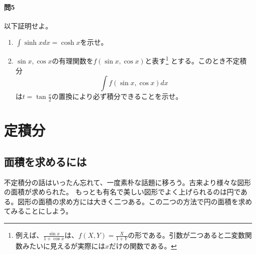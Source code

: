 \documentclass[a4j,dvipdfmx]{jsarticle}
\begin{document}
            \paragraph{問5}以下証明せよ。
                \begin{enumerate}\setcounter{enumi}{0}\renewcommand{\labelenumi}{(\arabic{enumi})}
                    \item $\displaystyle \int \sinh x dx = \cosh x$を示せ。
                    \item $\sin x,\cos x$の有理関数を$f(\sin x,\cos x)$と表す\footnote{例えば、$\frac{\sin x}{1+\cos x}$は、$f(X,Y)=\frac{X}{1+Y}$の形である。引数が二つあると二変数関数みたいに見えるが実際には$x$だけの関数である。}
                    とする。このとき不定積分
                        \begin{equation*}
                            \int f(\sin x,\cos x)dx
                        \end{equation*}
                        は$t=\tan\frac{x}{2}$の置換により必ず積分できることを示せ。
                \end{enumerate}
        \clearpage
        \section{定積分}
            \subsection{面積を求めるには}
                不定積分の話はいったん忘れて、一度素朴な話題に移ろう。古来より様々な図形の面積が求められた。
                もっとも有名で美しい図形でよく上げられるのは円である。図形の面積の求め方には大きく二つある。この二つの方法で円の面積を求めてみることにしよう。
\end{document}
